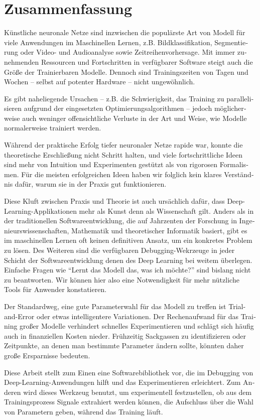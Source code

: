 \chapter*{Zusammenfassung}

\begin{otherlanguage}{german}

    Künstliche neuronale Netze sind inzwischen die populärste Art von Modell für
    viele Anwendungen im Maschinellen Lernen, z.B. Bildklassifikation,
    Segmentierung oder Video- und Audioanalyse sowie Zeitreihenvorhersage.  Mit
    immer zunehmenden Ressourcen und Fortschritten in verfügbarer Software
    steigt auch die Größe der Trainierbaren Modelle. Dennoch sind
    Trainingszeiten von Tagen und Wochen -- selbst auf potenter Hardware --
    nicht ungewöhnlich.

    Es gibt naheliegende Ursachen -- z.B. die Schwierigkeit, das Training zu
    parallelisieren aufgrund der eingesetzten Optimierungsalgorithmen -- jedoch
    möglicherweise auch weninger offensichtliche Verluste in der Art und Weise,
    wie Modelle normalerweise trainiert werden.

    Während der praktische Erfolg tiefer neuronaler Netze rapide war, konnte die
    theoretische Erschließung nicht Schritt halten, und viele fortschrittliche
    Ideen sind mehr von Intuition und Experimenten gestützt als von rigorosen
    Formalismen.  Für die meisten erfolgreichen Ideen haben wir folglich kein
    klares Verständnis dafür, warum sie in der Praxis gut funktionieren.

    Diese Kluft zwischen Praxis und Theorie ist auch ursächlich dafür, dass
    Deep-Learning-Applikationen mehr als Kunst denn als Wissenschaft gilt.
    Anders als in der traditionellen Softwareentwicklung, die auf Jahrzenten der
    Forschung in Ingenieurswissenschaften, Mathematik und theoretischer
    Informatik basiert, gibt es im maschinellen Lernen oft keinen definitiven Ansatz, um ein
    konkretes Problem zu lösen. Des Weiteren sind die verfügbaren
    Debugging-Wekrzeuge in jeder Schicht der Softwareentwicklung denen des Deep
    Learning bei weitem überlegen. Einfache Fragen wie ``Lernt das Modell das, was ich möchte?''
    sind bislang nicht zu beantworten. Wir können hier also eine Notwendigkeit
    für mehr nützliche Tools für Anwender konstatieren.

    Der Standardweg, eine gute Parameterwahl für das Modell zu treffen ist Trial-and-Error
    oder etwas intelligentere Variationen. Der Rechenaufwand für das Training großer Modelle
    verhindert schnelles Experimentieren und schlägt sich häufig auch in finanziellen Kosten nieder.
    Frühzeitig Sackgassen zu identifizieren oder Zeitpunkte, an denen man bestimmte Parameter ändern sollte,
    könnten daher große Ersparnisse bedeuten.

    Diese Arbeit stellt zum Einen eine Softwarebibliothek vor, die im Debugging
    von Deep-Learning-Anwendungen hilft und das Experimentieren erleichtert. Zum
    Anderen wird dieses Werkzeug benutzt, um experimentell festzustellen, ob aus
    dem Trainingsprozess Signale extrahiert werden können, die Aufschluss über
    die Wahl von Parametern geben, während das Training läuft.

\end{otherlanguage}
